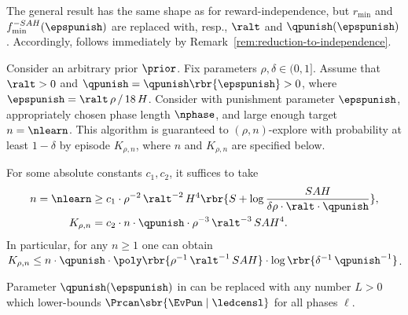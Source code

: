 The general result has the same shape as  for reward-independence, but
    $r_{\min}$ and $f_{\min}^{-SAH}(\epspunish)$
are replaced with, resp., $\ralt$ and $\qpunish(\epspunish)$. Accordingly,  follows immediately by Remark~\ref{rem:reduction-to-independence}.

\begin{theorem}\label{thm:main_prob_mdp}
Consider an arbitrary prior $\prior$. Fix parameters $\rho, \delta\in (0,1]$. Assume that $\ralt>0$ and
    $\qpunish = \qpunish\rbr{\epspunish}>0$,
where
    $\epspunish = \ralt\,\rho\,/\, 18\,H$.
Consider  with punishment parameter $\epspunish$, appropriately chosen phase length $\nphase$, and large enough target $n=\nlearn$. This algorithm is guaranteed to $(\rho,n)$-explore with probability at least $1-\delta$ by episode $K_{\rho,n}$, where $n$ and $K_{\rho,n}$ are specified below.


For some absolute constants $c_1,c_2$, it suffices to take
\begin{align}
n=\nlearn &\ge
     c_1\cdot \rho^{-2}\, \ralt^{-2}\,H^4
        \rbr{ S + \log \frac{SAH}{\delta\rho\cdot\ralt\cdot \qpunish} },
        \label{eq:thm:main_prob_mdp-n} \\
K_{\rho,n} &= c_2\cdot n\cdot \qpunish \cdot \rho^{-3}\, \ralt^{-3}\, SAH^4.
\end{align}
In particular, for any $n\geq 1$ one can obtain
 $K_{\rho,n} \leq n\cdot \qpunish
        \cdot \poly\rbr{\rho^{-1}\, \ralt^{-1}\, SAH  }
        \cdot \log\rbr{\delta^{-1}\,\qpunish^{-1}}$.
    \label{eq:thm:main_prob_mdp-K}
 \end{theorem}

\begin{remark}\label{rem:replace-qpun}
{Parameter $\qpunish(\epspunish)$ in  can be replaced with any number $L>0$ which lower-bounds
    $\Prcan\sbr{ \EvPun\mid \ledcensl}$
for all phases $\ell$.}
\end{remark}



